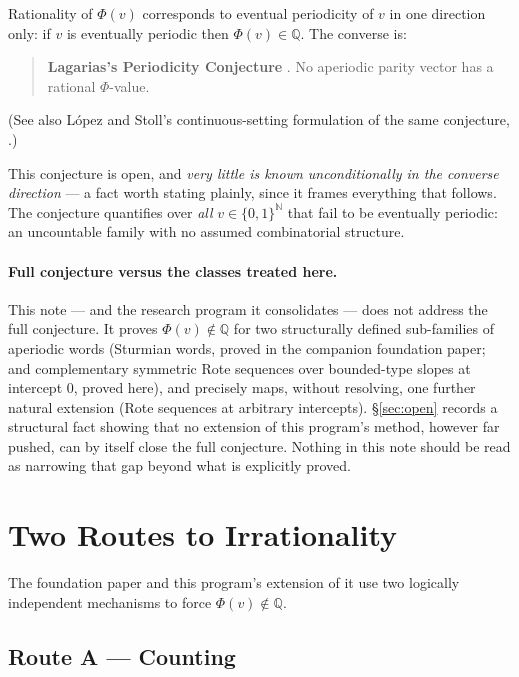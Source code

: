 \documentclass[11pt]{article}
\newcommand{\Q}{\mathbb{Q}}
\newcommand{\N}{\mathbb{N}}
\begin{document}
Rationality of $\Phi(v)$ corresponds to eventual periodicity of $v$ in one direction only: if $v$ is eventually periodic then $\Phi(v)\in\Q$. The converse is:

\begin{quote}
\textbf{Lagarias's Periodicity Conjecture} \cite[\S2]{Lagarias1985}. No aperiodic parity vector has a rational $\Phi$-value.
\end{quote}
(See also López and Stoll's continuous-setting formulation of the same conjecture, \cite{LopezStoll2021}.)

This conjecture is open, and \emph{very little is known unconditionally in the converse direction} --- a fact worth stating plainly, since it frames everything that follows. The conjecture quantifies over \emph{all} $v\in\{0,1\}^\N$ that fail to be eventually periodic: an uncountable family with no assumed combinatorial structure.

\paragraph{Full conjecture versus the classes treated here.} This note --- and the research program it consolidates --- does not address the full conjecture. It proves $\Phi(v)\notin\Q$ for two structurally defined sub-families of aperiodic words (Sturmian words, proved in the companion foundation paper; and complementary symmetric Rote sequences over bounded-type slopes at intercept $0$, proved here), and precisely maps, without resolving, one further natural extension (Rote sequences at arbitrary intercepts). \S\ref{sec:open} records a structural fact showing that no extension of this program's method, however far pushed, can by itself close the full conjecture. Nothing in this note should be read as narrowing that gap beyond what is explicitly proved.

\section{Two Routes to Irrationality}
\label{sec:tworoutes}

The foundation paper and this program's extension of it use two logically independent mechanisms to force $\Phi(v)\notin\Q$.

\subsection{Route A --- Counting}
\label{sec:routeA}
\end{document}
